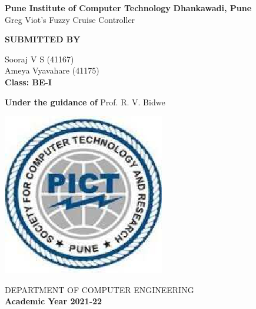 \documentclass[a4paper, 12pt, fleqn]{article}
\begin{document}
 
\begin{titlepage}
    \begin{center}
        \vspace*{1cm}
        \par
        \large
                \textbf{Pune Institute of Computer Technology}	
                \linebreak
		\textbf{Dhankawadi, Pune}
        \vspace{0.5cm}
        \linebreak
        \vspace{0.5cm}
        \large
        \\Greg Viot's Fuzzy Cruise Controller 
        \linebreak
        \linebreak
		
		\textbf{SUBMITTED BY}
		\vspace{1cm}
		
         Sooraj V S (41167) \\
         Ameya Vyavahare (41175) \\
         \textbf{Class: BE-I}
        \linebreak
        \linebreak
		        
        \textbf{\large{Under the guidance of}}
		\linebreak
	    Prof. R. V. Bidwe
		\linebreak
        
        
        
        \vspace{0.8cm}
        

        \includegraphics[scale=0.6]{pict}   
        
        \Large
        DEPARTMENT OF COMPUTER ENGINEERING\\
		\textbf{Academic Year 2021-22}
        
    \end{center}
\end{titlepage}
\pagebreak
\end{document}
